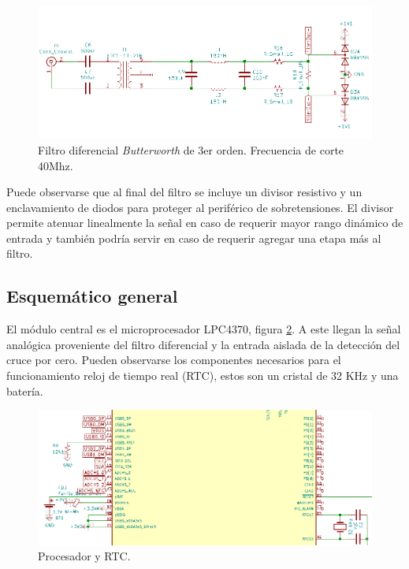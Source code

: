 \begin{figure}[ht]
	\centering
	\includegraphics[width=140mm]{./Figures/schFiltro.png}
	\caption{Filtro diferencial \textit{Butterworth} de 3er orden. Frecuencia de corte 40Mhz.}
	\label{fig:schFiltro}
\end{figure}


Puede observarse que al final del filtro se incluye un divisor resistivo y un enclavamiento de diodos para proteger al periférico de sobretensiones. El divisor permite atenuar linealmente la señal en caso de requerir mayor rango dinámico de entrada y también podría servir en caso de requerir agregar una etapa más al filtro.

\subsection{Esquemático general} 

El módulo central es el microprocesador LPC4370, figura \ref{fig:schCentral}. A este llegan la señal analógica proveniente del filtro diferencial y la entrada aislada de la detección del cruce por cero. Pueden observarse los componentes necesarios para el funcionamiento reloj de tiempo real (RTC), estos son un cristal de 32 KHz y una batería.


\begin{figure}[ht]
	\centering
	\includegraphics[width=140mm]{./Figures/schCentral.png}
	\caption{Procesador y RTC.}
	\label{fig:schCentral}
\end{figure}


